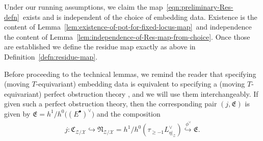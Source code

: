 \documentclass[12pt,dvipsnames]{amsart}
\begin{document}
Under our running assumptions, we claim the map~\eqref{eqn:preliminary-Res-defn}~exists and is independent of the choice of embedding data. Existence is the content of Lemma~\ref{lem:existence-of-pot-for-fixed-locus-map}~and independence the content of Lemma~\ref{lem:independence-of-Res-map-from-choice}. Once those are established we define the residue map exactly as above in Definition~\ref{defn:residue-map}.

\begin{remark}\label{rmk:embedding-data-is-POT}
  Before proceeding to the technical lemmas, we remind the reader that specifying (moving \(T\)-equivariant) embedding data is equivalent to specifying a (moving \(T\)-equivariant) perfect obstruction theory \cite[Prop. 3.11]{manolache_VirtualPullbacks2012}, and we will use them interchangeably. If given such a perfect obstruction theory, then the corresponding pair \((j,\mathfrak E)\) is given by \(\mathfrak E = h^1/h^0\big((E^\bullet)^\vee\big)\) and the composition
  \begin{align*}
    j: \mathfrak C_{\mathcal Z/\mathcal X} \hookrightarrow \mathfrak N_{\mathcal Z/\mathcal X} = h^1/h^0(\tau_{\geq -1}L_{\eta|_{\mathcal Z}}^\vee) \overset{~\phi^\vee}{\hookrightarrow}\mathfrak E.
  \end{align*}
\end{remark}
\end{document}
